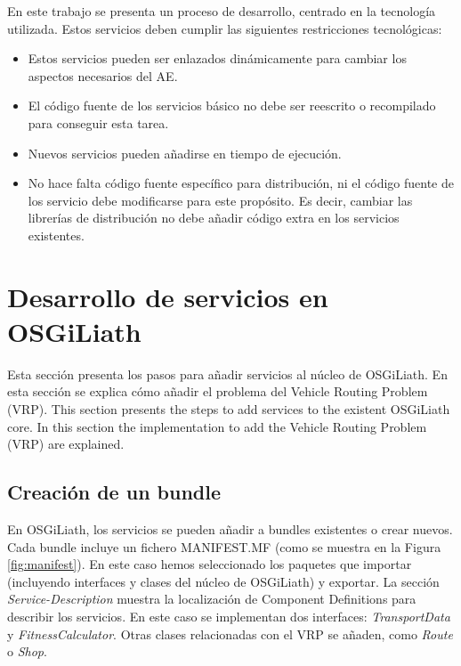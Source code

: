 \documentclass[runningheads]{llncs}
\begin{document}
En este trabajo se presenta un proceso de desarrollo, centrado en la tecnología utilizada. Estos servicios deben cumplir las siguientes restricciones tecnológicas:
\begin{itemize}
\item Estos servicios pueden ser enlazados dinámicamente para cambiar los aspectos necesarios del AE.
\item El código fuente de los servicios básico no debe ser reescrito o recompilado para conseguir esta tarea.
\item Nuevos servicios pueden añadirse en tiempo de ejecución.
\item No hace falta código fuente específico para distribución, ni el código fuente de los servicio debe modificarse para este propósito. Es decir, cambiar las librerías de distribución no debe añadir código extra en los servicios existentes.
\end{itemize}

\section{Desarrollo de servicios en OSGiLiath}
\label{sec:development}

Esta sección presenta los pasos para añadir servicios al núcleo de OSGiLiath. En esta sección se explica cómo añadir el problema del Vehicle Routing Problem (VRP).
This section presents the steps to add services to the existent OSGiLiath core. In this section the implementation to add the Vehicle Routing Problem (VRP) are explained.

\subsection{Creación de un bundle}

En OSGiLiath, los servicios se pueden añadir a bundles existentes o crear nuevos. Cada bundle incluye un fichero MANIFEST.MF (como se muestra en la Figura \ref{fig:manifest}). En este caso hemos seleccionado los paquetes que importar (incluyendo interfaces y clases del núcleo de OSGiLiath) y exportar. La sección {\em Service-Description} muestra la localización de Component Definitions para describir los servicios. En este caso se implementan dos interfaces: {\em TransportData} y {\em FitnessCalculator}. Otras clases relacionadas con el VRP se añaden, como {\em Route} o {\em Shop}.
\end{document}
